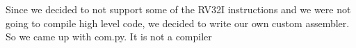 Since we decided to not support some of the RV32I instructions and we were not going to compile high level code, we decided to write our own custom assembler. So we came up with com.py. It is not a compiler 